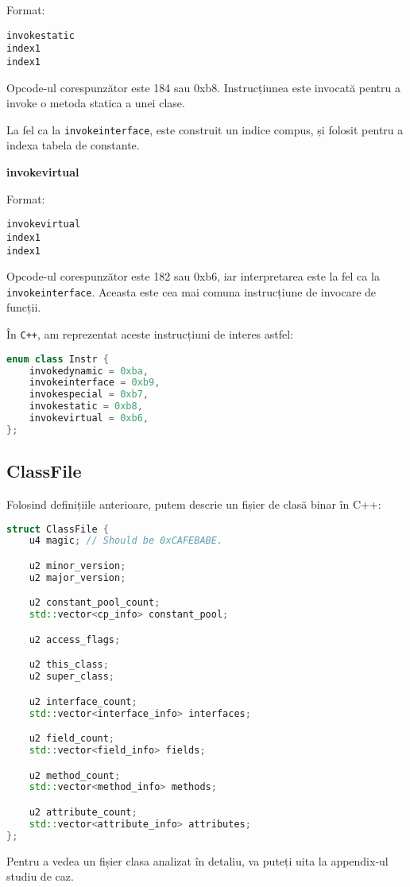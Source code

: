 Format:
\begin{verbatim}
invokestatic
index1
index1
\end{verbatim}

Opcode-ul corespunzător este 184 sau 0xb8.
Instrucțiunea este invocată pentru a invoke o metoda statica a unei
clase.

La fel ca la \texttt{invokeinterface}, este construit un indice compus,
și folosit pentru a indexa tabela de constante.

\textbf{invokevirtual}

Format:
\begin{verbatim}
invokevirtual
index1
index1
\end{verbatim}

Opcode-ul corespunzător este 182 sau 0xb6, iar
interpretarea este la fel ca la \texttt{invokeinterface}.
Aceasta este cea mai comuna instrucțiune de invocare de funcții.

În \texttt{C++}, am reprezentat aceste instrucțiuni de interes astfel:

\begin{lstlisting}[language=C++]
enum class Instr {
    invokedynamic = 0xba,
    invokeinterface = 0xb9,
    invokespecial = 0xb7,
    invokestatic = 0xb8,
    invokevirtual = 0xb6,
};
\end{lstlisting}

\subsection{ClassFile}\label{classfile}

Folosind definițiile anterioare, putem descrie un fișier de clasă binar
în C++:

\begin{lstlisting}[language=C++]
struct ClassFile {
    u4 magic; // Should be 0xCAFEBABE.

    u2 minor_version;
    u2 major_version;

    u2 constant_pool_count;
    std::vector<cp_info> constant_pool;

    u2 access_flags;

    u2 this_class;
    u2 super_class;

    u2 interface_count;
    std::vector<interface_info> interfaces;

    u2 field_count;
    std::vector<field_info> fields;

    u2 method_count;
    std::vector<method_info> methods;

    u2 attribute_count;
    std::vector<attribute_info> attributes;
};
\end{lstlisting}

Pentru a vedea un fișier clasa analizat în detaliu, va puteți
uita la appendix-ul studiu de caz.
